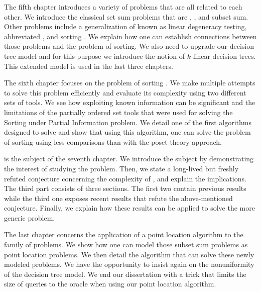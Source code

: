 The fifth chapter introduces a variety of problems that are all related to
each other. We introduce the classical set sum problems that are
\threeSUM, \kSUM, and subset sum. Other problems include a generalization of
\kSUM known as linear degeneracy testing, abbreviated \kLDT, and sorting \XY.
We explain how one can establish connections between those problems and the problem
of sorting. We also need to upgrade our decision tree model and for this
purpose we introduce the notion of \(k\)-linear decision trees. This
extended model is used in the last three chapters.

The sixth chapter focuses on the problem of sorting \XY. We make
multiple attempts to solve this problem efficiently and evaluate its complexity
using two different sets of tools. We see how exploiting known information
can be significant and the limitations of the partially ordered set tools that
were used for solving the Sorting under Partial Information problem. We
detail one of the first algorithms designed to solve  and
show that using this algorithm, one can solve the problem of sorting \XY
using less comparisons than with the poset theory approach.

\threeSUM is the subject of the seventh chapter. We introduce the
subject by demonstrating the interest of studying the \threeSUM problem. Then,
we state a long-lived but freshly refuted conjecture concerning the
complexity of \threeSUM, and explain the implications. The third part
consists of three sections. The first two contain previous results while
the third one exposes recent results that refute the above-mentioned
conjecture. Finally, we explain how these results can be applied to solve
the more generic \kLDT problem.

The last chapter concerns the application of a point location algorithm to
the family of \kSUM problems. We show how one can model those subset sum
problems as point location problems. We then detail the algorithm that
can solve these newly modeled problems. We have the opportunity to insist again
on the nonuniformity of the decision tree model. We end our dissertation
with a trick that limits the size of queries to the oracle when
using our point location algorithm.
